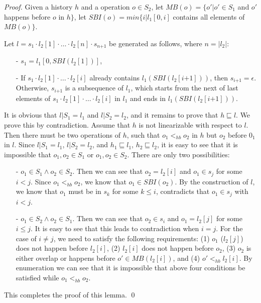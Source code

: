 \begin {proof}

Given a history $h$ and a operation $o \in S_2$, let $\textit{MB}(o) = \{ o' \vert o' \in S_1$ and $o'$ happens before $o$ in $h \}$, let $\textit{SBI}(o) = \textit{min}\{ i \vert l_1[0,i]$ contains all elements of $\textit{MB}(o) \}$.

Let $l = s_1 \cdot l_2[1] \cdot \ldots \cdot l_2[n] \cdot s_{\textit{n+1}}$ be generated as follows, where $n = \vert l_2 \vert$:

\begin{itemize}
\setlength{\itemsep}{0.5pt}
\item[-] $s_1 = l_1[0, \textit{SBI}(l_2[1])]$,

\item[-] If $s_1 \cdot l_2[1] \cdot \ldots \cdot l_2[i]$ already contains $l_1(\textit{SBI}(l_2[\textit{i+1}]))$, then $s_{\textit{i+1}} = \epsilon$. Otherwise, $s_{\textit{i+1}}$ is a subsequence of $l_1$, which starts from the next of last elements of $s_1 \cdot l_2[1] \cdot \ldots \cdot l_2[i]$ in $l_1$ and ends in $l_1(\textit{SBI}(l_2[\textit{i+1}]))$.
\end{itemize}

It is obvious that $l \vert{S_1} = l_1$ and $l \vert{S_2} = l_2$, and it remains to prove that $h \sqsubseteq l$. We prove this by contradiction. Assume that $h$ is not linearizable with respect to $l$. Then there must be two operations of $h$, such that $o_1 <_{hb} o_2$ in $h$ but $o_2$ before $0_1$ in $l$. Since $l \vert{S_1} = l_1$, $l \vert{S_2} = l_2$, and $h_1 \sqsubseteq l_1$, $h_2 \sqsubseteq l_2$, it is easy to see that it is impossible that $o_1,o_2 \in S_1$ or $o_1,o_2 \in S_2$. There are only two possibilities:

\begin{itemize}
\setlength{\itemsep}{0.5pt}
\item[-] $o_1 \in S_1 \wedge o_2 \in S_2$. Then we can see that $o_2=l_2[i]$ and $o_1 \in s_j$ for some $i < j$. Since $o_1 <_{hb} o_2$, we know that $o_1 \in \textit{SBI}(o_2)$. By the construction of $l$, we know that $o_1$ must be in $s_k$ for some $k \leq i$, contradicts that $o_1 \in s_j$ with $i < j$.

\item[-] $o_1 \in S_2 \wedge o_2 \in S_1$. Then we can see that $o_2 \in s_i$ and $o_1 = l_2[j]$ for some $i \leq j$. It is easy to see that this leads to contradiction when $i = j$. For the case of $i \neq j$, we need to satisfy the following requirements: (1) $o_1$ ($l_2[j]$) does not happen before $l_2[i]$, (2) $l_2[i]$ does not happen before $o_2$, (3) $o_2$ is either overlap or happens before $o' \in \textit{MB}(l_2[i])$, and (4) $o' <_{hb} l_2[i]$. By enumeration we can see that it is impossible that above four conditions be satisfied while $o_1 <_{hb} o_2$.
\end{itemize}

This completes the proof of this lemma. \qed
\end {proof}

